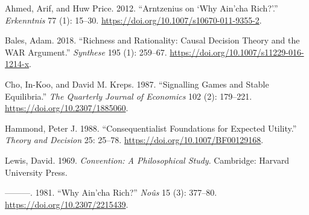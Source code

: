 \documentclass[
  12pt,
]{article}
\newlength{\cslhangindent}
\newlength{\cslentryspacingunit} %
\newenvironment{CSLReferences}[2] %
 {%
  \setlength{\parindent}{0pt}
  \ifodd #1
  \let\oldpar\par
  \def\par{\hangindent=\cslhangindent\oldpar}
  \fi
  \setlength{\parskip}{#2\cslentryspacingunit}
 }%
 {}
\begin{document}
\hypertarget{refs}{}
\begin{CSLReferences}{1}{0}
\leavevmode{}%
Ahmed, Arif, and Huw Price. 2012. {``Arntzenius on `Why Ain'cha Rich?'.''} \emph{Erkenntnis} 77 (1): 15--30. \url{https://doi.org/10.1007/s10670-011-9355-2}.

\leavevmode{}%
Bales, Adam. 2018. {``Richness and Rationality: Causal Decision Theory and the WAR Argument.''} \emph{Synthese} 195 (1): 259--67. \url{https://doi.org/10.1007/s11229-016-1214-x}.

\leavevmode{}%
Cho, In-Koo, and David M. Kreps. 1987. {``Signalling Games and Stable Equilibria.''} \emph{The Quarterly Journal of Economics} 102 (2): 179--221. \url{https://doi.org/10.2307/1885060}.

\leavevmode{}%
Hammond, Peter J. 1988. {``Consequentialist Foundations for Expected Utility.''} \emph{Theory and Decision} 25: 25--78. \url{https://doi.org/10.1007/BF00129168}.

\leavevmode{}%
Lewis, David. 1969. \emph{Convention: A Philosophical Study}. Cambridge: Harvard University Press.

\leavevmode{}%
---------. 1981. {``Why Ain'cha Rich?''} \emph{No{û}s} 15 (3): 377--80. \url{https://doi.org/10.2307/2215439}.

\end{CSLReferences}
\end{document}
